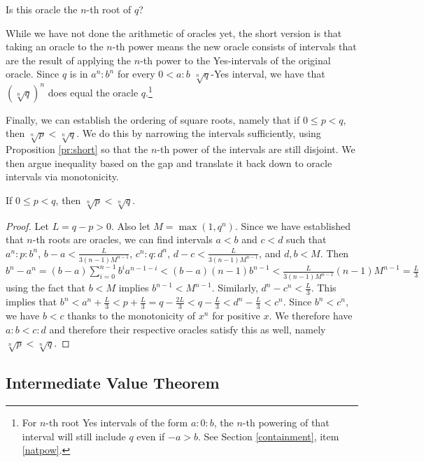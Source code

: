 \documentclass[12pt]{article}
\begin{document}
Is this oracle the $n$-th root of $q$?

While we have not done the arithmetic of oracles yet, the short version is that taking an oracle to the $n$-th power means the new oracle consists of intervals that are the result of applying the $n$-th power to the Yes-intervals of the original oracle. Since $q$ is in $a^n:b^n$ for every $0<a:b$ $\sqrt[n]{q}$-Yes interval, we have that $(\sqrt[n]{q})^n$ does equal the oracle $q$.\footnote{For $n$-th root Yes \-intervals of the form $a:0:b$, the $n$-th powering of that interval will still include $q$ even if $-a>b$. See Section \ref{containment}, item \ref{natpow}.} 

Finally, we can establish the ordering of square roots, namely that if $0 \leq p<q$, then $\sqrt[n]{p} < \sqrt[n]{q}$. We do this by narrowing the intervals sufficiently, using Proposition \ref{pr:short} so that the $n$-th power of the intervals are still disjoint. We then argue inequality based on the gap and translate it back down to oracle intervals via monotonicity. 

\begin{proposition}
    If $0 \leq p <q$, then $\sqrt[n]{p} < \sqrt[n]{q}$.
\end{proposition}

\begin{proof}
    Let $L = q-p > 0$. Also let $M = \max(1, q^n)$.  Since we have established that $n$-th roots are oracles, we can find intervals $a\lt b$ and $c \lt d$ such that $a^n:p:b^n$, $b-a < \frac{L}{3(n-1)M^{n-1}}$, $c^n:q:d^n$, $d-c < \frac{L}{3(n-1)M^{n-1}}$,  and $d, b < M$.  Then $b^n-a^n = (b-a) \sum_{i=0}^{n-1} b^i a^{n-1-i} < (b-a)(n-1) b^{n-1} < \frac{L}{3(n-1)M^{n-1}} (n-1) M^{n-1} = \frac{L}{3}$ using the fact that $b<M$ implies $b^{n-1} < M^{n-1}$. Similarly, $d^n-c^n < \frac{L}{3}$. This implies that $b^n < a^n + \frac{L}{3}  < p + \frac{L}{3}  = q - \frac{2 L }{3} < q -  \frac{L}{3} < d^n - \frac{L}{3} < c^n$. Since $b^n < c^n$, we have $b < c$ thanks to the monotonicity of $x^n$ for positive $x$. We therefore have $a:b < c:d$ and therefore their respective oracles satisfy this as well, namely $\sqrt[n]{p} < \sqrt[n]{q}$.
\end{proof}



\subsection{Intermediate Value Theorem}\label{sec:ivt}
\end{document}
